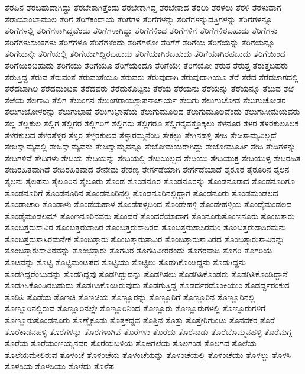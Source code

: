 {ತೆರಪಿನ
ತೆರಬಹುದಾಗಿದ್ದು
ತೆರಬೇಕಾಗಿತ್ತೆಂದು
ತೆರಬೇಕಾಗಿದ್ದ
ತೆರಬೇಕಾದ
ತೆರಲು
ತೆರಳಲು
ತೆರಳಿ
ತೆರಳುವಾಗ
ತೆರಾಯಾಂಬಾಮುಲ
ತೆರಿಗೆ
ತೆರಿಗೆಕಂದಾಯ
ತೆರಿಗೆಗಳ
ತೆರಿಗೆಗಳನ್ನು
ತೆರಿಗೆಗಳನ್ನುದತ್ತಿಗಳನ್ನು
ತೆರಿಗೆಗಳನ್ನೂ
ತೆರಿಗೆಗಳಲ್ಲಿ
ತೆರಿಗೆಗಳಾಗಿದ್ದವೆಂದು
ತೆರಿಗೆಗಳಾಗಿದ್ದು
ತೆರಿಗೆಗಳಿಂದ
ತೆರಿಗೆಗಳಿಗೆ
ತೆರಿಗೆಗಳಿರಬಹುದು
ತೆರಿಗೆಗಳು
ತೆರಿಗೆಗಳುಸುಂಕಗಳು
ತೆರಿಗೆಗಳೂ
ತೆರಿಗೆಗಳೆಂದು
ತೆರಿಗೆಗಳೋ
ತೆರಿಗೆಗೆ
ತೆರಿಗೆಯ
ತೆರಿಗೆಯನ್ನು
ತೆರಿಗೆಯನ್ನೂ
ತೆರಿಗೆಯನ್ನೇ
ತೆರಿಗೆಯಲ್ಲಿ
ತೆರಿಗೆಯಾಗಿದ್ದಿರಬಹುದು
ತೆರಿಗೆಯಾಗಿರಬಹುದು
ತೆರಿಗೆಯಾಗಿರಹಬುದು
ತೆರಿಗೆಯಿಂದ
ತೆರಿಗೆಯಿರಬಹುದು
ತೆರಿಗೆಯು
ತೆರಿಗೆಯೂ
ತೆರಿಗೆಯೆಂದೂ
ತೆರಿಗೆಯೇ
ತೆರಿಗೆಯೋ
ತೆರುತ
ತೆರುತ್ತ
ತೆರುತ್ತಬಹರು
ತೆರುತ್ತಿದ್ದ
ತೆರುವ
ತೆರುವಂತೆ
ತೆರುವಂತೆಯೂ
ತೆರುವರು
ತೆರುವುದಾಗಿ
ತೆರುವುದಾಗಿಯೂ
ತೆರೆ
ತೆರೆದ
ತೆರೆದಜಾಗದಲ್ಲಿ
ತೆರೆದಬಾಗಿಲ
ತೆರೆದಮಂಟಪ
ತೆರೆದವರು
ತೆರೆದುಕೊಟ್ಟನು
ತೆರೆಯ
ತೆರೆಯನು
ತೆರೆಯನ್ನು
ತೆರೆಯನ್ನೂ
ತೆಱುವ
ತೆಱೆ
ತೆಱೆಯ
ತೆಲಗಾವಿ
ತೆಲಿಗ
ತೆಲುಂಗನ
ತೆಲುಂಗರಾಯಸ್ಥಾಪನಾಚಾರ್ಯ
ತೆಲುಗು
ತೆಲುಗುಚೋಡ
ತೆಲುಗುಚೋಡರ
ತೆಲುಗುಚೋಳರನ್ನು
ತೆಲುಗುಭಾಷೆ
ತೆಲುಗುಭಾಷೆಯ
ತೆಲುಗುಮೂಲದ
ತೆಲುಗುಮೂಲವೆಂದು
ತೆಲುಗುಸೀಮೆಯವರು
ತೆಲ್ಲ
ತೆಲ್ಲಕುಲ
ತೆಲ್ಲಿಗ
ತೆಲ್ಲಿಗರ
ತೆಲ್ಲಿಗರಿಗೆ
ತೆಲ್ಲಿಗರು
ತೆಲ್ಲಿಗರೂ
ತೆಲ್ಲಿಗರೈವತ್ತೊಕ್ಕಲು
ತೆಳನೂರ
ತೆಳರ
ತೆಳರಕುಲತಿಲಕ
ತೆಳರಕುಲದ
ತೆಳರತೆಳ್ಳರ
ತೆಳ್ಳರ
ತೆಳ್ಳರಕುಲದ
ತೆಳ್ಳಾರಮ್ಮನೆಂಬ
ತೇಕಲ್ಲು
ತೇಗಿನಹಳ್ಳಿ
ತೇಜ
ತೇಜಸಾಮ್ಯವಿಲ್ಲದೆ
ತೇಜಸ್ವಾಮ್ಯದಲ್ಲಿ
ತೇಜಸ್ವಾಮ್ಯವನು
ತೇಜಸ್ವಾಮ್ಯವನ್ನೂ
ತೇಜೋಮಯರಾಗಿದ್ದು
ತೇಜೋಮೂರ್ತಿ
ತೇದಿ
ತೇದಿಗಳನ್ನು
ತೇದಿಗಳಿವೆ
ತೇದಿಗಳು
ತೇದಿಯ
ತೇದಿಯನ್ನು
ತೇದಿಯಲ್ಲಿ
ತೇದಿಯಿಲ್ಲದ
ತೇದಿಯು
ತೇದಿಯುಕ್ತ
ತೇದಿಯುಳ್ಳ
ತೇದಿರಹಿತ
ತೇದಿರಹಿತವಾಗಿದೆ
ತೇದಿರಹಿತವಾದ
ತೇನೇಮ
ತೇರಣ್ಯ
ತೇರ್ಗಡೆಯಾಗಿ
ತೇರ್ಗಡೆಯಾದೆ
ತೈರೂರ
ತೈರೂರಿನ
ತೈಲನ
ತೈಲನು
ತೈಲಪನು
ತೈಲೂರಿನ
ತೈಲೂರು
ತೊಂಡ
ತೊಂಡನೂರ
ತೊಂಡನೂರನ್ನು
ತೊಂಡನೂರಾದ
ತೊಂಡನೂರಿಗೂ
ತೊಂಡನೂರಿಗೆ
ತೊಂಡನೂರಿನ
ತೊಂಡನೂರಿನಲ್ಲಿ
ತೊಂಡನೂರಿನಲ್ಲಿದ್ದಾಗ
ತೊಂಡನೂರು
ತೊಂಡಮಂಡಲದ
ತೊಂಡಾಚಾರಿ
ತೊಂಡಾಳು
ತೊಂಡೆಯಹಾಳ
ತೊಂಡೆಹಳ್ಳದಿಂದ
ತೊಂಡೇಹಳ್ಳಿ
ತೊಂಡೇಹಳ್ಳಿಯ
ತೊಂಡೈಮಂಡಲದ
ತೊಂಡೈಮಂಡಲಮ್
ತೊಂಣನೂರಿನವರು
ತೊಂದರೆ
ತೊಂದರೆಯಾದಾಗ
ತೊಂನೂರುತೊಂಣನೂರು
ತೊಂಬತಾರು
ತೊಂಬತ್ತರುಸಾವಿರ
ತೊಂಬತ್ತರುಸಾಸಿರ
ತೊಂಬತ್ತರುಸಾಸಿರದ
ತೊಂಬತ್ತರುಸಾಸಿರಮಂ
ತೊಂಬತ್ತರುಸಾಸಿರಮನು
ತೊಂಬತ್ತರುಸಾಸಿರಮನೇಕ
ತೊಂಬತ್ತಾರು
ತೊಂಬತ್ತಾರುಸಾವಿರ
ತೊಂಬತ್ತಾರುಸಾವಿರದ
ತೊಂಬತ್ತಾರುಸಾವಿರನ್ನು
ತೊಂಬತ್ತಾರುಸಾವಿರವನ್ನು
ತೊಂಭತ್ತಾರು
ತೊಗಟರ
ತೊಗಟವೀರರೆಂದು
ತೊಗರವಾಡಿ
ತೊಗರಿ
ತೊಗರಿಯ
ತೊಟವನ್ನು
ತೊಟ್ಟಿ
ತೊಟ್ಟಿಮಂಟಪದ
ತೊಟ್ಟಿಯು
ತೊಟ್ಟಿಲು
ತೊಡಗಿಕೊಂಡಿದ್ದನು
ತೊಡಗಿದ್ದನು
ತೊಡಗಿದ್ದರೆಂಬುದನ್ನು
ತೊಡಗಿದ್ದವು
ತೊಡಗಿದ್ದುದನ್ನು
ತೊಡಗಿಸಲು
ತೊಡಗಿಸಿಕೊಂಡರು
ತೊಡಗಿಸಿಕೊಂಡಿದ್ದಾನೆ
ತೊಡಗಿಸಿಕೊಂಡಿರಬಹುದು
ತೊಡಗಿಸಿಕೊಂಡಿರುವುದು
ತೊಡಗುತ್ತಿದ್ದ
ತೊಡರ್ದರಡೊಂಕಿಯುಂ
ತೊಡರ್ದ್ದರಂಕುಸ
ತೊಡಿಸಿ
ತೊಡೆಯ
ತೊಣಚಿ
ತೊಣಚಿಯ
ತೊಣ್ಣೂರನ್ನು
ತೊಣ್ಣೂರಿಗೆ
ತೊಣ್ಣೂರಿನ
ತೊಣ್ಣೂರಿನಲ್ಲಿ
ತೊಣ್ಣೂರಿನಲ್ಲಿರುವ
ತೊಣ್ಣೂರಿನಲ್ಲೇ
ತೊಣ್ಣೂರಿನಿಂದ
ತೊಣ್ಣೂರು
ತೊಣ್ಣೂರುಗಳಲ್ಲಿ
ತೊಣ್ಣೂರುಗಳಿಗೆ
ತೊಣ್ಣೂರುತೊಂಡನೂರು
ತೊಣ್ಣೈಕೂಡು
ತೊತ್ತಕದ್ದವ
ತೊತ್ತಿನ
ತೊತ್ತು
ತೊತ್ತೇರಿಗುಂಟು
ತೊನದಕರ
ತೊರೆ
ತೊರೆಕಾಡನಹಳ್ಳಿ
ತೊರೆಗಳನ್ನು
ತೊರೆಗಳಾಗಿವೆ
ತೊರೆಗಳು
ತೊರೆದು
ತೊರೆನಾಡು
ತೊರೆಬೊಮ್ಮನಹಳ್ಳಿ
ತೊರೆಮಗ್ಗ
ತೊರೆಯ
ತೊರೆಯಂಣಯ್ಯನವರ
ತೊರೆಯಬಳಿಯ
ತೊಱಗಲೆಯ
ತೊಲಗಂಡ
ತೊಲಗದ
ತೊಲೆಯ
ತೊಲೆಯಮೇಲಿರುವ
ತೊಳಂಚೆ
ತೊಳಂಚೆಯ
ತೊಳಂಚೆಯನ್ನು
ತೊಳಂಚೆಯಲ್ಲಿ
ತೊಳಂಚೆಯು
ತೊಳಲ್ದು
ತೊಳಸಿ
ತೊಳಸಿಯ
ತೊಳಸಿಯು
ತೊಳೆದು
ತೊಳೆಪ
}
